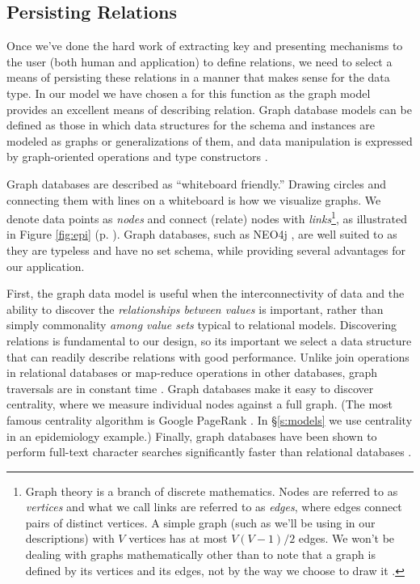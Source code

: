 \subsection{Persisting Relations} \label{s:pr}
Once we've done the hard work of extracting key \md{} and presenting mechanisms to the user (both human and application) to define relations, we need to select a means of persisting these relations in a manner that makes sense for the data type. In our model we have chosen a \gdb{} for this function as the graph model provides an excellent means of describing relation. Graph database models can be defined as those in which data structures for the schema and instances are modeled as graphs or generalizations of them, and data manipulation is expressed by graph-oriented operations and type constructors \cite{Angles:2008:SGD:1322432.1322433}.

Graph databases are described as ``whiteboard friendly.'' Drawing circles and connecting them with lines on a whiteboard is how we visualize graphs. We denote data points as \emph{nodes} and connect (relate) nodes with \emph{links}\footnote{Graph theory is a branch of discrete mathematics. Nodes are referred to as \emph{vertices} and what we call links are referred to as \emph{edges}, where edges connect pairs of distinct vertices. A simple graph (such as we'll be using in our descriptions) with $V$ vertices has at most $V(V-1)/2$ edges. We won't be dealing with graphs mathematically other than to note that a graph is defined by its vertices and its edges, not by the way we choose to draw it \cite{DBLP:books/daglib/0001826}.}, as illustrated in Figure \ref{fig:epi} (p. \pageref{fig:epi}). Graph databases, such as NEO4j \cite{Webber:2012:PIN:2384716.2384777}, are well suited to \ud{} as they are typeless and have no set schema, while providing several advantages for our application.

First, the graph data model is useful when the interconnectivity of data and the ability to discover the \emph{relationships between values} is important, rather than simply commonality \emph{among value sets} typical to relational models. Discovering relations is fundamental to our design, so its important we select a data structure that can readily describe relations with good performance. Unlike join operations in relational databases or map-reduce operations in other databases, graph traversals are in constant time \cite{redmond2012seven}. Graph databases make it easy to discover centrality, where we measure individual nodes against a full graph. (The most famous centrality algorithm is Google PageRank \cite{ilprints422}. In \S\ref{s:models} we use centrality in an epidemiology example.) Finally, graph databases have been shown to perform full-text character searches significantly faster than relational databases \cite{Vicknair:2010:CGD:1900008.1900067}.

